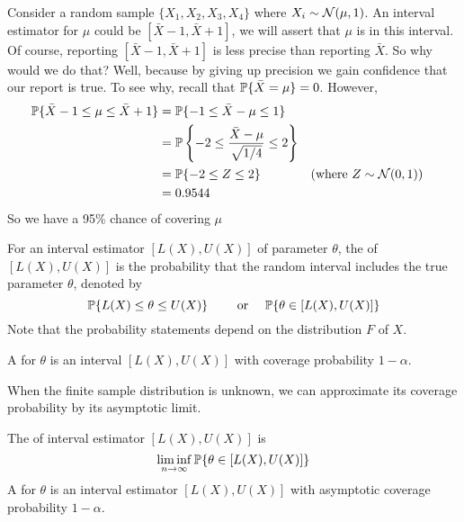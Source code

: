 \documentclass[10pt]{article}
\begin{document}
\begin{example}
	Consider a random sample $\{X_1,X_2,X_3,X_4\}$ where $X_i \sim \mathcal{N}(\mu,1)$. An interval estimator for $\mu$ could be $[\bar{X} - 1,\bar{X} + 1]$, we will assert that $\mu$ is in this interval. Of course, reporting $[\bar{X} - 1,\bar{X}+1]$ is less precise than reporting $\bar{X}$. So why would we do that? Well, because by giving up precision we gain confidence that our report is true. To see why, recall that $\mathbb{P}\{\bar{X} = \mu\} = 0$. However, 
	\begin{align*}
		\mathbb{P}\{ \bar{X}-1 \le \mu \le \bar{X}+1\} &= \mathbb{P}\{-1 \le \bar{X} - \mu \le 1\} \\
		&= \mathbb{P}\left\{ -2 \le \frac{\bar{X}-\mu}{\sqrt{1 / 4}} \le 2\right\} \\
		&= \mathbb{P} \{-2 \le Z \le 2\} &&\text{(where } Z \sim \mathcal{N}(0,1)\text{)} \\
		&= 0.9544
	\end{align*}
	So we have a 95\% chance of covering $\mu$
\end{example}

\begin{definition}
	For an interval estimator $[L(X),U(X)]$ of parameter $\theta$, the  of $[L(X),U(X)]$ is the probability that the random interval includes the true parameter $\theta$, denoted by
	\[
	\mathbb{P}\{L(X) \le \theta \le U(X)\} \qquad \text{ or } \quad \mathbb{P}\{\theta \in [L(X),U(X)]\}
	\]
	Note that the probability statements depend on the distribution $F$ of $X$. 
\end{definition}

\begin{definition}
	A  for $\theta$ is an interval $[L(X),U(X)]$ with coverage probability $1-\alpha$. 
\end{definition}

\begin{remark} 
When the finite sample distribution is unknown, we can approximate its coverage probability by its asymptotic limit.	
\end{remark}

\begin{definition}
	The  of interval estimator $[L(X),U(X)]$ is
	\[
	\liminf_{n\to\infty} \mathbb{P}\{\theta \in [L(X),U(X)]\}
	\]
	A  for $\theta$ is an interval estimator $[L(X),U(X)]$ with asymptotic coverage probability $1-\alpha$.
\end{definition}
\end{document}
